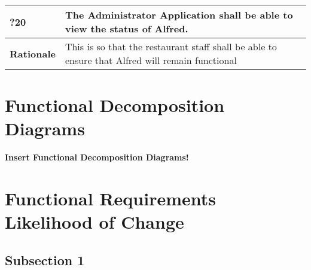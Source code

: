 \documentclass [11pt]{article}
\begin{document}
\begin{longtable}{| p{ } | p{ } | }\hline 
	\rowcolor{tableCell}\textbf{?20} & The Administrator Application shall be able to view the status of Alfred. \\ \hline
	\textbf{Rationale} &  This is so that the restaurant staff shall be able to ensure that Alfred will remain functional\\ \hline 
\end{longtable}





\section{Functional Decomposition Diagrams}
\textbf{Insert Functional Decomposition Diagrams!}
%	
%
%
%	



\section{Functional Requirements Likelihood of Change}  %

\subsection{Subsection 1}
\end{document}
